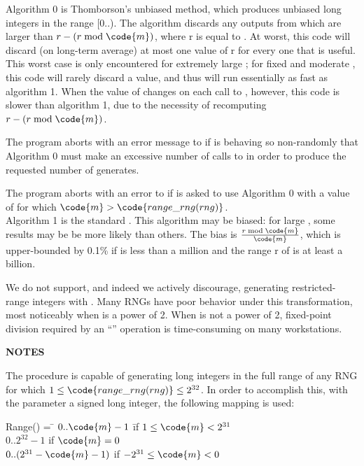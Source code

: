 \begin{tex}
Algorithm 0 is Thomborson's unbiased method, which produces unbiased
long integers in the range [0..).  The algorithm discards any
outputs from  which are larger than $r-(r \bmod \code{m})$, where
r is equal to .  At worst, this code will discard
(on long-term average) at most one value of r for every one that is
useful.  This worst case is only encountered for extremely large
; for fixed and moderate , this code will rarely discard a
value, and thus will run essentially as fast as algorithm 1.  When the
value of  changes on each call to , however, this
code is slower than algorithm 1, due to the necessity of recomputing
$r-(r \bmod \code{m})$.

The program aborts with an error message to  if 
is behaving so non-randomly that Algorithm 0 must make an excessive
number of calls to  in order to produce the requested number of
generates.

The program aborts with an error to  if  is
asked to use Algorithm 0 with a value of  for which $\code{m} >
\code{range\_rng(rng)}$. \\


Algorithm 1 is the standard .  This
algorithm may be biased: for large , some results may be be more
likely than others.  The bias is $\frac{r \bmod \code{m}}{\code{m}}$, which is
upper-bounded by 0.1\% if  is less than a million and the range
r of  is at least a billion.

We do not support, and indeed we actively discourage, generating
restricted-range integers with .  Many RNGs have
poor behavior under this transformation, most noticeably when 
is a power of 2.  When  is not a power of 2, fixed-point
division required by an ``\code{\%}'' operation is time-consuming on many
workstations.\\
\end{tex}

\noindent
{\bf NOTES}

\begin{tex}
The  procedure is capable of generating long integers in
the full range of any RNG for which $1 \leq \code{range\_rng(rng)} \leq
2^{32}$.  In order to accomplish this, with the parameter  a
signed long integer, the following mapping is used:

\begin{tabbing}
Range() = \=	$0..\code{m}-1$ \hspace{.5in} \= if $1 \leq
\code{m} < 2^{31}$\\
\> $0.. 2^{32}-1$ \> if $\code{m}=0$\\
\> $0..(2^{31}-\code{m}-1)$ \> if $-2^{31} \leq \code{m} < 0$
\end{tabbing}
\end{tex}

